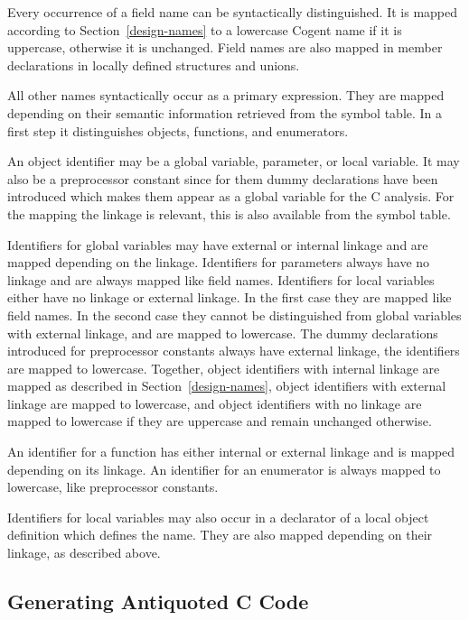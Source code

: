 Every occurrence of a field name can be syntactically distinguished. It is mapped according to 
Section~\ref{design-names} to a lowercase Cogent name if it is uppercase, otherwise it is unchanged.
Field names are also mapped in member declarations in locally defined structures and unions.

All other names syntactically occur as a primary expression. They are mapped depending on their semantic
information retrieved from the symbol table. In a first step it distinguishes objects, functions, 
and enumerators.

An object identifier may be a global variable, parameter, or local variable. It may also be a preprocessor 
constant since for them dummy declarations have been introduced which makes them appear as a global variable
for the C analysis. For the mapping the linkage is relevant, this is also available from the symbol table.

Identifiers for global variables may have external or internal linkage and are mapped depending on the
linkage. Identifiers for parameters always have no linkage and are always mapped like field names. Identifiers
for local variables either have no linkage or external linkage. In the first case they are mapped like
field names. In the second case they cannot be distinguished from global variables with external linkage,
and are mapped to lowercase. The dummy declarations introduced for preprocessor constants
always have external linkage, the identifiers are mapped to lowercase. Together, object identifiers with 
internal linkage are mapped as described in Section~\ref{design-names}, object identifiers with external
linkage are mapped to lowercase, and object identifiers with no linkage are mapped to lowercase if they are
uppercase and remain unchanged otherwise.

An identifier for a function has either internal or external linkage and is mapped depending on its linkage.
An identifier for an enumerator is always mapped to lowercase, like preprocessor constants.

Identifiers for local variables may also occur in a declarator of a local object definition which defines 
the name. They are also mapped depending on their linkage, as described above.

\subsection{Generating Antiquoted C Code}
\label{impl-ccode-anti}

